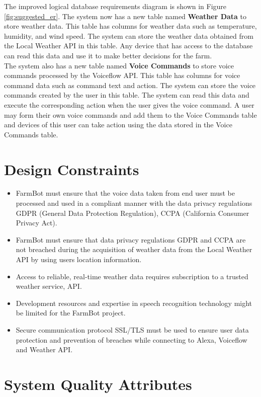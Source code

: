 The improved logical database requirements diagram is shown in Figure \ref{fig:suggested_er}.
The system now has a new table named \textbf{Weather Data} to store weather data. This table has columns for weather data such as temperature, humidity, and wind speed. The system can store the weather data obtained from the Local Weather API in this table. Any device that has access to the database can read this data and use it to make better decisions for the farm.
\\
The system also has a new table named \textbf{Voice Commands} to store voice commands processed by the Voiceflow API. This table has columns for voice command data such as command text and action. The system can store the voice commands created by the user in this table. The system can read this data and execute the corresponding action when the user gives the voice command. A user may form their own voice commands and add them to the Voice Commands table and devices of this user can take action using the data stored in the Voice Commands table.

\section{Design Constraints}
\begin{itemize}
    \item FarmBot must ensure that the voice data taken from end user must be processed and used in a compliant manner with the data privacy regulations GDPR (General Data Protection Regulation), CCPA (California Consumer Privacy Act).
    \item FarmBot must ensure that data privacy regulations GDPR and CCPA are not breached during the acquisition of weather data from the Local Weather API by using users location information.
    \item Access to reliable, real-time weather data requires subscription to a trusted weather service, API.
    \item Development resources and expertise in speech recognition technology might be limited for the FarmBot project.
    \item Secure communication protocol SSL/TLS must be used to ensure user data protection and prevention of breaches while connecting to Alexa, Voiceflow and Weather API.
\end{itemize}

\section{System Quality Attributes}

